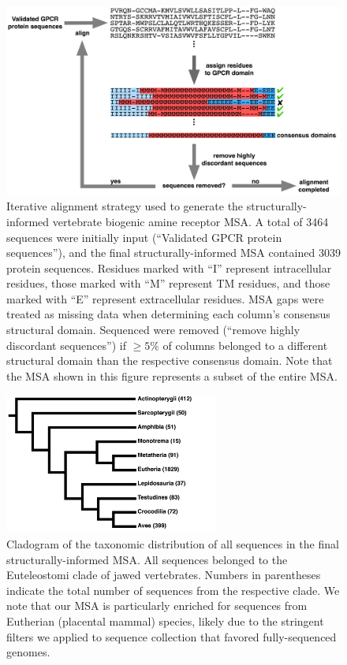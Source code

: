 \documentclass[fleqn,10pt]{wlpeerj}
\begin{document}
\newpage

\begin{figure}[htbp]
	\centerline{\includegraphics[width=18cm]{../figures/alignment_flowchart.png}}
	\caption{\label{flowchart} Iterative alignment strategy used to generate the structurally-informed vertebrate biogenic amine receptor MSA. A total of 3464 sequences were initially input (``Validated GPCR protein sequences''), and the final structurally-informed MSA contained 3039 protein sequences. Residues marked with ``I'' represent intracellular residues, those marked with ``M'' represent TM residues, and those marked with ``E'' represent extracellular residues. MSA gaps were treated as missing data when determining each column's consensus structural domain. Sequenced were removed (``remove highly discordant sequences'') if $\geq 5\%$ of columns belonged to a different structural domain than the respective consensus domain. Note that the MSA shown in this figure represents a subset of the entire MSA.}
\end{figure}


\begin{figure}[htbp]
	\centerline{\includegraphics[width=7cm]{../figures/taxonomic_distribution.png}}
	\caption{\label{taxa_dist} Cladogram of the taxonomic distribution of all sequences in the final structurally-informed MSA. All sequences belonged to the Euteleostomi clade of jawed vertebrates. Numbers in parentheses indicate the total number of sequences from the respective clade. We note that our MSA is particularly enriched for sequences from Eutherian (placental mammal) species, likely due to the stringent filters we applied to sequence collection that favored fully-sequenced genomes.}
\end{figure}
\end{document}
